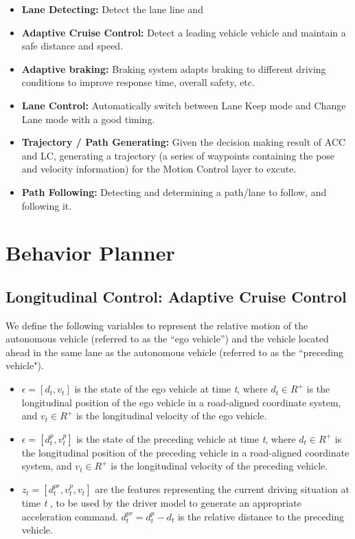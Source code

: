 \begin{itemize}
\item \textbf {Lane Detecting:} Detect the lane line and 
\item \textbf{Adaptive Cruise Control:} Detect a leading vehicle vehicle and maintain a safe distance and speed.
\item \textbf{Adaptive braking:} Braking system adapts braking to different driving conditions to improve response time, overall safety, etc.
\item \textbf{Lane Control:} Automatically switch between Lane Keep mode and Change Lane mode with a good timing.
\item \textbf{Trajectory / Path Generating:} Given the decision making result of ACC and LC, generating a trajectory (a series of waypoints containing the pose and velocity information) for the Motion Control layer to excute.
\item \textbf{Path Following:} Detecting and determining a path/lane to follow, and following it.
\end{itemize}

\section{Behavior Planner}

\subsection{Longitudinal Control:  Adaptive Cruise Control}

We define the following variables to represent the relative motion of the autonomous vehicle (referred to as the ``ego vehicle'') and the vehicle located ahead in the same lane as the autonomous vehicle (referred to as the ``preceding vehicle").

\begin{itemize}
\item $\epsilon = [d_t, v_t]$ is the state of the ego vehicle at time \textit{t}, where $d_t \in R^+$ is the longitudinal position of the ego vehicle in a road-aligned coordinate system, and $v_t \in R^+$ is the longitudinal velocity of the ego vehicle.
\item $\epsilon = [d_t^p, v_t^p]$ is the state of the preceding vehicle at time \textit{t}, where $d_t \in R^+$ is the longitudinal position of the preceding vehicle in a road-aligned coordinate system, and $v_t \in R^+$ is the longitudinal velocity of the preceding vehicle.
\item $z_t =  [d_t^{pr}, v_t^p, v_t]$ are the features representing the current driving situation at time \textit{t} , to be used by the driver model to generate an appropriate acceleration command. $d_t^{pr} = d_t^p - d_t$ is the relative distance to the preceding vehicle.
\end{itemize}

